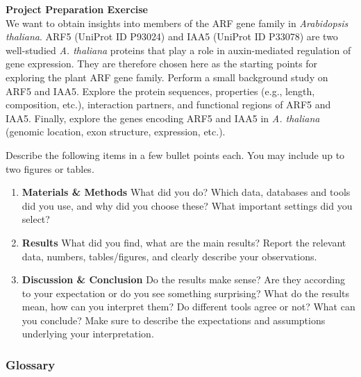 \begin{framed}
\textbf{\textbf{Project Preparation Exercise}}\\
We want to obtain insights into members of the ARF gene family in \textit{Arabidopsis thaliana}.
ARF5 (UniProt ID P93024) and IAA5 (UniProt ID P33078) are two well-studied \textit{A. thaliana} proteins that play a role in auxin-mediated regulation of gene expression.
They are therefore chosen here as the starting points for exploring the plant ARF gene family.
Perform a small background study on ARF5 and IAA5.
Explore the protein sequences, properties (e.g., length, composition, etc.), interaction partners, and functional regions of ARF5 and IAA5.
Finally, explore the genes encoding ARF5 and IAA5 in \textit{A. thaliana} (genomic location, exon structure, expression, etc.).

Describe the following items in a few bullet points each.
You may include up to two figures or tables.

\begin{enumerate}
\item \textbf{Materials \& Methods} What did you do? Which data, databases and tools did you use, and why did you choose these? What important settings did you select?
\item \textbf{Results} What did you find, what are the main results? Report the relevant data, numbers, tables/figures, and clearly describe your observations.
\item \textbf{Discussion \& Conclusion} Do the results make sense? Are they according to your expectation or do you see something surprising? What do the results mean, how can you interpret them? Do different tools agree or not? What can you conclude? Make sure to describe the expectations and assumptions underlying your interpretation.
\end{enumerate}
\end{framed}

\subsubsection{Glossary}